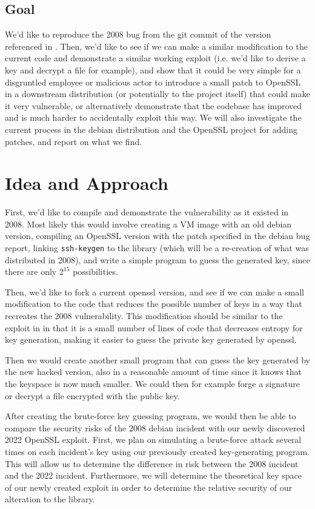 \documentclass[conference]{IEEEtran}
\begin{document}
\subsection{Goal}
We'd like to reproduce the 2008 bug from the git commit of the version
referenced in \cite{2}. Then, we'd like to see if we can make a
similar modification to the current code and demonstrate a similar
working exploit (i.e. we'd like to derive a key and decrypt a file for
example), and show that it could be very simple for a disgruntled
employee or malicious actor to introduce a small patch to OpenSSL in a
downstream distribution (or potentially to the project itself) that
could make it very vulnerable, or alternatively demonstrate that the
codebase has improved and is much harder to accidentally exploit this
way. We will also investigate the current process in the debian
distribution and the OpenSSL project for adding patches, and report on
what we find.

\section{Idea and Approach}

First, we'd like to compile and demonstrate the vulnerability as it
existed in 2008. Most likely this would involve creating a VM image
with an old debian version, compiling an OpenSSL version with the
patch specified in the debian bug report\cite{3}, linking
\verb|ssh-keygen| to the library (which will be a re-creation of what
was distributed in 2008), and write a simple program to guess the
generated key, since there are only $2^{15}$ possibilities.

Then, we'd like to fork a current openssl version, and see if we can
make a small modification to the code that reduces the possible number
of keys in a way that recreates the 2008 vulnerability. This
modification should be similar to the exploit in \cite{1} in that it
is a small number of lines of code that decreases entropy for key
generation, making it easier to guess the private key generated by
openssl.

Then we would create another small program that can guess the key
generated by the new hacked version, also in a reasonable amount of
time since it knows that the keyspace is now much smaller. We could
then for example forge a signature or decrypt a file encrypted with
the public key.

After creating the brute-force key guessing program, we would then 
be able to compare the security risks of the 2008 debian incident 
with our newly discovered 2022 OpenSSL exploit. First, we plan on 
simulating a brute-force attack several times on each incident’s 
key using our previously created key-generating program. This will 
allow us to determine the difference in risk between the 2008 
incident and the 2022 incident. Furthermore, we will determine the 
theoretical key space of our newly created exploit in order to 
determine the relative security of our alteration to the library.
\end{document}

